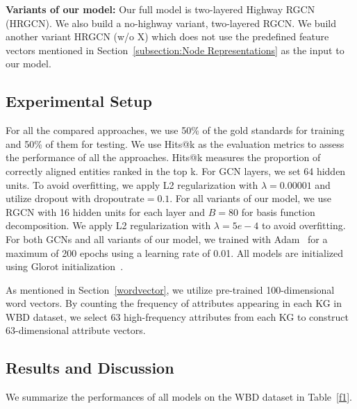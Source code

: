 	\noindent \textbf{Variants of our model:} Our full model is two-layered Highway RGCN (HRGCN). We also build a no-highway variant, two-layered RGCN. We build another variant HRGCN (w/o X) which does not use the predefined feature vectors mentioned in Section~\ref{subsection:Node Representations} as the input to our model. 
	
	\subsection{Experimental Setup}
	For all the compared approaches, we use 50\% of the gold standards for training and 50\% of them for testing. We use Hits@k as the evaluation metrics to assess the performance of all the approaches. Hits@k measures the proportion of correctly aligned entities ranked in the top k. 
	For GCN layers, we set 64 hidden units. To avoid overfitting, we apply L2 regularization with $\lambda=0.00001$ and utilize dropout with $\mathrm{dropout rate}=0.1$.
	For all variants of our model, we use RGCN with 16 hidden units for each layer and $B = 80$ for basis function decomposition. We apply L2 regularization with $\lambda=5e-4$ to avoid overfitting.
	For both GCNs and all variants of our model, we trained with Adam~\cite{Kingma2014Adam} for a maximum of 200 epochs using a learning rate of 0.01. All models are initialized using Glorot initialization~\cite{Glorot2010Understanding}. 
	
	As mentioned in Section~\ref{wordvector}, we utilize pre-trained 100-dimensional word vectors. By counting the frequency of attributes appearing in each KG in WBD dataset, we select 63 high-frequency attributes from each KG to construct 63-dimensional attribute vectors.
	
	\subsection{Results and Discussion}
	
	We summarize the performances of all models on the WBD dataset in Table~\ref{f1}.
	

